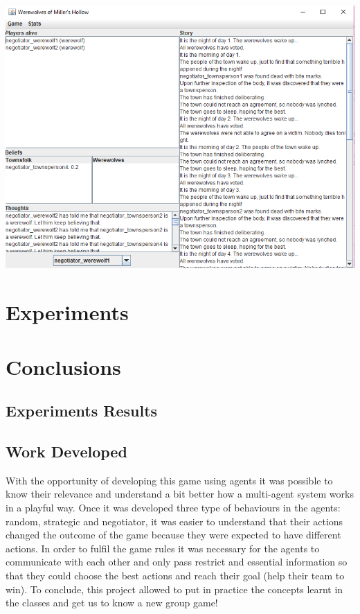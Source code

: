 \documentclass{article}
\begin{document}
\begin{center}
\includegraphics[width=1\textwidth]{./images/gui.png}\par\vspace{1cm}
\end{center}

\section{Experiments}

\section{Conclusions}
\subsection{Experiments Results}
\subsection{Work Developed}
With the opportunity of developing this game using agents it was possible to know their relevance and understand a bit better how a multi-agent system works in a playful way. 
\newline
Once it was developed three type of behaviours in the agents: random, strategic and negotiator, it was easier to understand that their actions changed the outcome of the game because they were expected to have different actions.
\newline
In order to fulfil the game rules it was necessary for the agents to communicate with each other and only pass restrict and essential information so that they could choose the best actions and reach their goal (help their team to win).
\newline
To conclude, this project allowed to put in practice the concepts learnt in the classes and get us to know a new group game!
\end{document}
